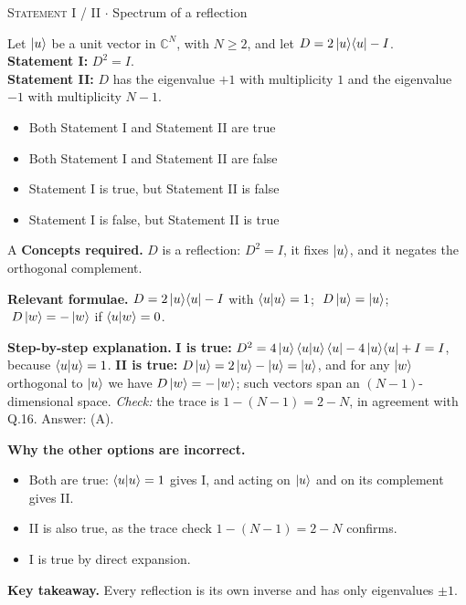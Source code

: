 \documentclass[11pt,a4paper]{article}
\newcommand{\optlabel}[1]{\textbf{(#1)}}
\newcommand{\correctlabel}[1]{\textcolor{okgreen}{\textbf{(#1)}\,\ding{51}}}
\newenvironment{qitem}[1]{\begin{list}{}{\setlength{\leftmargin}{3.3em}\setlength{\labelwidth}{3.1em}%
  \setlength{\labelsep}{0.2em}\setlength{\topsep}{3pt}\setlength{\parsep}{3pt}}\item[\textbf{Q.#1}\hfill]}{\end{list}}
\newcommand{\qsep}{\par\vspace{2pt}{\color{black!15}\hrule}\vspace{4pt}}
\newcommand{\qmeta}[2]{{\footnotesize\color{black!60}\textsc{#1} \;$\cdot$\; #2}\par}
\begin{document}
\begin{qitem}{18}
\qmeta{Statement I / II}{Spectrum of a reflection}
Let $\ket{u}$ be a unit vector in $\mathbb{C}^{N}$, with $N \ge 2$, and let $D = 2\ket{u}\!\bra{u} - I$.\\[1mm]
\textbf{Statement I:} $D^2 = I$.\\[1mm]
\textbf{Statement II:} $D$ has the eigenvalue $+1$ with multiplicity $1$ and the eigenvalue $-1$ with multiplicity $N - 1$.
\begin{itemize}[leftmargin=2.6em, labelsep=0.4em, itemsep=2pt, topsep=3pt]
\item[\correctlabel{A}] Both Statement I and Statement II are true
\item[\optlabel{B}] Both Statement I and Statement II are false
\item[\optlabel{C}] Statement I is true, but Statement II is false
\item[\optlabel{D}] Statement I is false, but Statement II is true
\end{itemize}
\end{qitem}
\begin{solbox}{A}
\textbf{\color{brand}Concepts required.} $D$ is a reflection: $D^2 = I$, it fixes $\ket{u}$, and it negates the orthogonal complement.

\textbf{\color{brand}Relevant formulae.} $D = 2\ket{u}\!\bra{u} - I$ with $\braket{u|u} = 1$; $\;D\ket{u} = \ket{u}$; $\;D\ket{w} = -\ket{w}$ if $\braket{u|w} = 0$.

\textbf{\color{brand}Step-by-step explanation.} \textbf{I is true:} $D^2 = 4\ket{u}\braket{u|u}\bra{u} - 4\ket{u}\!\bra{u} + I = I$, because $\braket{u|u} = 1$.
\textbf{II is true:} $D\ket{u} = 2\ket{u} - \ket{u} = \ket{u}$, and for any $\ket{w}$ orthogonal to $\ket{u}$ we have $D\ket{w} = -\ket{w}$; such vectors span
an $(N-1)$-dimensional space. \emph{Check:} the trace is $1 - (N-1) = 2 - N$, in agreement with Q.16. Answer: (A).

\textbf{\color{brand}Why the other options are incorrect.}
\begin{itemize}[leftmargin=2.4em, itemsep=1pt, topsep=2pt]
\item[\textbf{(B)}] Both are true: $\braket{u|u} = 1$ gives I, and acting on $\ket{u}$ and on its complement gives II.
\item[\textbf{(C)}] II is also true, as the trace check $1 - (N-1) = 2 - N$ confirms.
\item[\textbf{(D)}] I is true by direct expansion.
\end{itemize}
\textbf{\color{brand}Key takeaway.} Every reflection is its own inverse and has only eigenvalues $\pm1$.
\end{solbox}
\qsep
\end{document}
